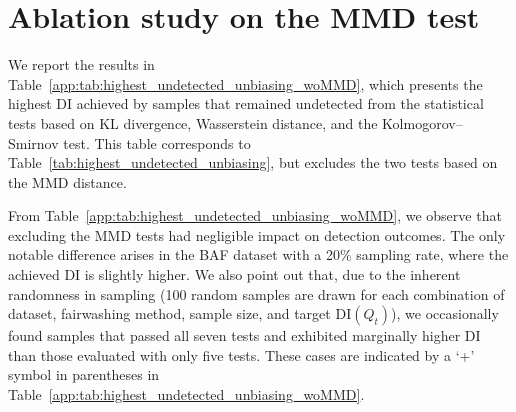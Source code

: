 \documentclass[runningheads, orivec]{llncs}
\begin{document}
\begin{table}[h!]
  \caption{KL divergence manipulation cost of the fairwashing methods ($\text{DI}(Q_t) \geq 0.8$), cost calculated on the projected dataset : $\text{KL}(Q_{n, (S,\widehat{Y})}, Q_{t, (S,\widehat{Y})})$ (where $X$ is excluded) with the original dataset $Q_n$ and $Q_t = f(Q_n)$ with $f$ the fairwashing method}
  \label{app:fum_kl_result_SY}
  \centering

\end{table}

\section{Ablation study on the MMD test}

We report the results in Table~\ref{app:tab:highest_undetected_unbiasing_woMMD}, which presents the highest DI achieved by samples that remained undetected from the statistical tests based on KL divergence, Wasserstein distance, and the Kolmogorov–Smirnov test. This table corresponds to Table~\ref{tab:highest_undetected_unbiasing}, but excludes the two tests based on the MMD distance. 

From Table~\ref{app:tab:highest_undetected_unbiasing_woMMD}, we observe that excluding the MMD tests had negligible impact on detection outcomes. The only notable difference arises in the BAF dataset with a 20\% sampling rate, where the achieved DI is slightly higher. We also point out that, due to the inherent randomness in sampling (100 random samples are drawn for each combination of dataset, fairwashing method, sample size, and target $\text{DI}(Q_t)$), we occasionally found samples that passed all seven tests and exhibited marginally higher DI than those evaluated with only five tests. These cases are indicated by a ‘+’ symbol in parentheses in Table~\ref{app:tab:highest_undetected_unbiasing_woMMD}.
\end{document}
